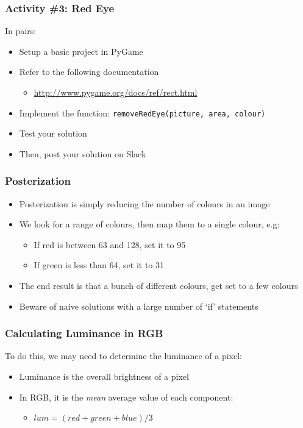 \begin{frame}
	\frametitle{Activity \#3: Red Eye}
	
	In pairs:
	
	\vspace{2em}
	
	\begin{itemize}		
		\item Setup a basic project in PyGame
		\item Refer to the following documentation
		\begin{itemize}
			\item \url{http://www.pygame.org/docs/ref/rect.html}
		\end{itemize}
		\item Implement the function: \texttt{removeRedEye(picture, area, colour)}
		\item Test your solution
		\item Then, post your solution on Slack
	\end{itemize}
\end{frame}


\begin{frame}
	\frametitle{Posterization}
	
	\begin{itemize}		
		\item Posterization is simply reducing the number of colours in an image
		\item We look for a range of colours, then map them to a single colour, e.g:
		\begin{itemize}
			\item If red is between 63 and 128, set it to 95
			\item If green is less than 64, set it to 31
		\end{itemize}	
		\item The end result is that a bunch of different colours, get set to a few colours
		\item Beware of naive solutions with a large number of `if' statements
	\end{itemize}
\end{frame}


\begin{frame}
	\frametitle{Calculating Luminance in RGB}
	
	To do this, we may need to determine the luminance of a pixel:
	
	\begin{itemize}		
		\item Luminance is the overall brightness of a pixel
		\item In RGB, it is the \textit{mean} average value of each component:
		\begin{itemize}
			\item $lum = (red + green + blue) / 3$
		\end{itemize}	
	\end{itemize}
\end{frame}



